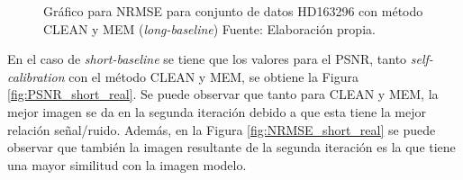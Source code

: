 \begin{figure}[!ht]
 \centering
 \caption[Gráfico para NRMSE para conjunto de datos HD163296 con método CLEAN y MEM (\textit{long-baseline})]{Gráfico para NRMSE para conjunto de datos HD163296 con método CLEAN y MEM (\textit{long-baseline}) Fuente: Elaboración propia.}
 \label{fig:NRMSE_long_real}
\end{figure}

En el caso de \textit{short-baseline} se tiene que los valores para el PSNR, tanto \textit{self-calibration} con el método CLEAN y MEM, se obtiene la Figura \ref{fig:PSNR_short_real}. Se puede observar que tanto para CLEAN y MEM, la mejor imagen se da en la segunda iteración debido a que esta tiene la mejor relación señal/ruido. Además, en la Figura \ref{fig:NRMSE_short_real} se puede observar que también la imagen resultante de la segunda iteración es la que tiene una mayor similitud con la imagen modelo. 

